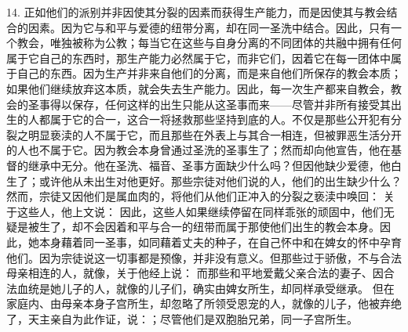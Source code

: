 14. 正如他们的派别并非因使其分裂的因素而获得生产能力，而是因使其与教会结合的因素。因为它与和平与爱德的纽带分离，却在同一圣洗中结合。因此，只有一个教会，唯独被称为公教；每当它在这些与自身分离的不同团体的共融中拥有任何属于它自己的东西时，那生产能力必然属于它，而非它们，因着它在每一团体中属于自己的东西。因为生产并非来自他们的分离，而是来自他们所保存的教会本质；如果他们继续放弃这本质，就会失去生产能力。因此，每一次生产都来自教会，教会的圣事得以保存，任何这样的出生只能从这圣事而来——尽管并非所有接受其出生的人都属于它的合一，这合一将拯救那些坚持到底的人。不仅是那些公开犯有分裂之明显亵渎的人不属于它，而且那些在外表上与其合一相连，但被罪恶生活分开的人也不属于它。因为教会本身曾通过圣洗的圣事生了；然而却向他宣告，他在基督的继承中无分。他在圣洗、福音、圣事方面缺少什么吗？但因他缺少爱德，他白生了；或许他从未出生对他更好。那些宗徒对他们说的人，他们的出生缺少什么？然而，宗徒又因他们是属血肉的，将他们从他们正冲入的分裂之亵渎中唤回： 关于这些人，他上文说： 因此，这些人如果继续停留在同样乖张的顽固中，他们无疑是被生了，却不会因着和平与合一的纽带而属于那使他们出生的教会本身。因此，她本身藉着同一圣事，如同藉着丈夫的种子，在自己怀中和在婢女的怀中孕育他们。因为宗徒说这一切事都是预像，并非没有意义。但那些过于骄傲，不与合法母亲相连的人，就像，关于他经上说： 而那些和平地爱戴父亲合法的妻子、因合法血统是她儿子的人，就像的儿子们，确实由婢女所生，却同样承受继承。 但在家庭内、由母亲本身子宫所生，却忽略了所领受恩宠的人，就像的儿子，他被弃绝了，天主亲自为此作证，说：；尽管他们是双胞胎兄弟，同一子宫所生。\par


